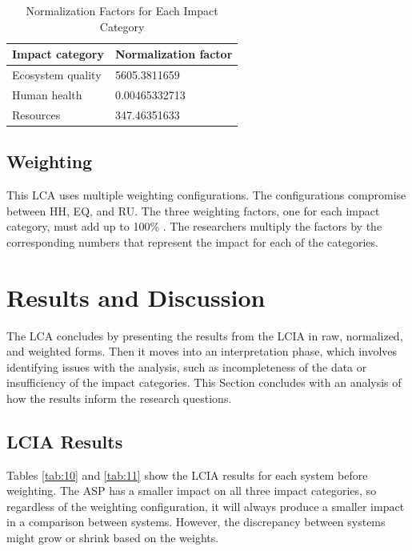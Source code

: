 \documentclass[final,journal,10pt,letterpaper,oneside,twocolumn,compsoc]%
{IEEEtran}
\begin{document}
\begin{table}[htbp]
  \caption{Normalization Factors for Each Impact Category}
  \label{tab:9}
  \centering
    \begin{tabular}{| l | l |}
      \hline
      Impact category   & Normalization factor \\
      \hline
      Ecosystem quality & 5605.3811659 \\
      Human health      & 0.00465332713 \\
      Resources         & 347.46351633 \\
      \hline
    \end{tabular}
\end{table}

\subsection{Weighting}
This LCA uses multiple weighting configurations. The configurations compromise
between HH, EQ, and RU.
The three weighting factors, one for each impact category, must add up to 100\%
\cite{triangle}.
The researchers multiply the factors by the corresponding numbers
that represent the impact for each of the categories.

\section{Results and Discussion}
The LCA concludes by presenting the results from the LCIA in raw, normalized,
and weighted forms. Then it moves into an interpretation phase, which
involves identifying issues with the analysis, such as incompleteness of the
data or insufficiency of the impact categories. This Section concludes with an
analysis of how the results inform the research questions.

\subsection{LCIA Results}
Tables \ref{tab:10} and \ref{tab:11} show the LCIA results for each system
before weighting. The ASP
has a smaller impact on all three impact categories, so regardless of the
weighting configuration, it will always produce a smaller impact in a
comparison between systems. However, the discrepancy between systems might grow
or shrink based on the weights.
\end{document}
